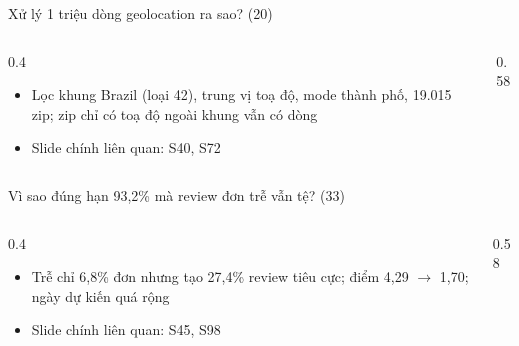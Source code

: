 \begin{frame}{Xử lý 1 triệu dòng geolocation ra sao? (20)}
\begin{columns}[T]\begin{column}{0.4\textwidth}
\begin{itemize}
  \item Lọc khung Brazil (loại 42), trung vị toạ độ, mode thành phố, 19.015 zip; zip chỉ có toạ độ ngoài khung vẫn có dòng
  \item Slide chính liên quan: S40, S72
\end{itemize}
\end{column}\begin{column}{0.58\textwidth}
\begin{center}\end{center}
\end{column}\end{columns}

\end{frame}

\begin{frame}{Vì sao đúng hạn 93,2\% mà review đơn trễ vẫn tệ? (33)}
\begin{columns}[T]\begin{column}{0.4\textwidth}
\begin{itemize}
  \item Trễ chỉ 6,8\% đơn nhưng tạo 27,4\% review tiêu cực; điểm 4,29 $\rightarrow$ 1,70; ngày dự kiến quá rộng
  \item Slide chính liên quan: S45, S98
\end{itemize}
\end{column}\begin{column}{0.58\textwidth}
\begin{center}\end{center}
\end{column}\end{columns}

\end{frame}

